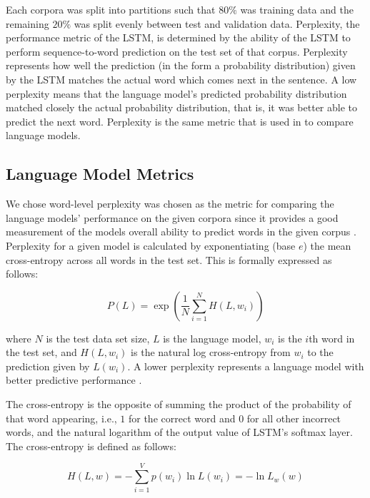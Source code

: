 \documentclass[runningheads,a4paper]{llncs}
\begin{document}

Each corpora was split into partitions such that $80\%$ was training data
and the remaining $20\%$ was split evenly between test and validation
data. Perplexity, the performance metric of the LSTM, is determined by the
ability of the LSTM to perform sequence-to-word prediction on the test
set of that corpus. Perplexity represents how well the prediction (in the
form a probability distribution) given by the LSTM matches the actual
word which comes next in the sentence. A low perplexity means that the
language model's predicted probability distribution matched closely the
actual probability distribution, that is, it was better able to predict
the next word. Perplexity is the same metric that is used in
\citet{LSTMArticle} to compare language models.

\subsection{Language Model Metrics}

We chose word-level perplexity was chosen as the metric for comparing the
language models' performance on the given corpora since it provides
a good measurement of the models overall ability to predict words
in the given corpus \cite{sundermeyer2015feedforward}. 
Perplexity for a given model is calculated
by exponentiating (base $e$) the mean
cross-entropy across all words in the test set. This is formally
expressed as follows:

\begin{equation}
\label{perplexity}
    P(L) = \exp\left(\frac{1}{N}\sum^{N}_{i=1} H(L,w_i)\right)
\end{equation}

where $N$ is the test data set size, $L$ is the language model, $w_i$
is the $i$th word in the test set, and $H(L, w_i)$ is the natural log
cross-entropy from $w_i$ to the prediction given by $L(w_i)$. A lower
perplexity represents a language model with better predictive
performance \cite{wang2016parallel}.

The cross-entropy is the opposite of summing the
product of the probability of that word appearing, i.e., $1$ for the
correct word and $0$ for all other incorrect words, and the
natural logarithm of the output value of LSTM's softmax layer.
The cross-entropy is defined as follows:

\begin{equation}
\label{cross-entropy}
    H(L,w) = - \sum_{i=1}^V p(w_i) \ln L(w_i) = - \ln L_w(w)
\end{equation}
\end{document}
